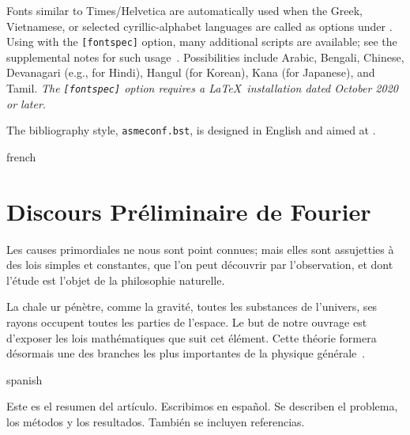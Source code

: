 \documentclass[balance,upint,subscriptcorrection,varvw,mathalfa=cal=boondoxo,spanish,french,vietnamese,russian,greek,pdf-a,fontspec,colorlinks]{asmeconf}
\begin{document}
Fonts similar to Times/Helvetica are automatically used when the Greek, Vietnamese, or selected cyrillic-alphabet languages are called as options under {\upshape{}}. Using {\upshape{}} with the \texttt{[fontspec]} option, many additional scripts are available; see the supplemental notes for such usage~\cite{lienhard2021}. Possibilities include Arabic, Bengali, Chinese, Devanagari (e.g., for Hindi), Hangul (for Korean), Kana (for Japanese), and Tamil. \textit{The {\upshape\texttt{[fontspec]}} option requires a \LaTeX\ installation dated October 2020 or later.}

The bibliography style, \texttt{asmeconf.bst}, is designed in English and aimed at .  


\begin{selectlanguage}{french}%
\section{Discours Préliminaire de Fourier}\label{app:fourier}
Les causes primordiales ne nous sont point con­nues; mais elles sont assujetties à des lois simples et constantes, que l'on peut découvrir par l'obser­vation, et dont l'étude est l'objet de la philosophie naturelle. 

La chale ur pénètre, comme la gravité, toutes les substances de l'univers, ses rayons occupent toutes les parties de l'espace. Le but de notre ouvrage est d'exposer les lois mathématiques que suit cet élé­ment. Cette théorie formera désormais une des branches les plus importantes de la physique gé­nérale~\cite{fourier1822}. 
\end{selectlanguage}%
 
\begin{selectlanguage}{spanish}%
\begin{abstract*}
Este es el resumen del artículo. Escribimos en español. Se describen el problema, los métodos y los resultados. También se incluyen referencias.
\end{abstract*}
\end{selectlanguage}%

\end{document}
